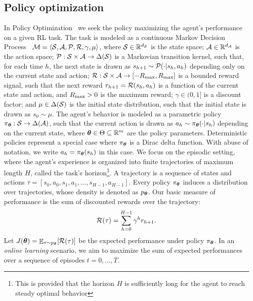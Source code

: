 \documentclass{article}
\begin{document}
\subsection{Policy optimization}
In Policy Optimization~\citep{deisenroth2013survey} we seek the policy maximizing the agent's performance on a given RL task. The task is modeled as a continuous Markov Decision Process~\citep[MDP,][]{puterman2014markov} $\mathcal{M} = \langle\mathcal{S},\mathcal{A},\mathcal{P},\mathcal{R},\gamma,\mu\rangle$, where $\mathcal{S}\in\mathbb{R}^{d_{\mathcal{S}}}$ is the state space; $\mathcal{A}\in\mathbb{R}^{d_{\mathcal{A}}}$ is the action space; $\mathcal{P}:\mathcal{S}\times\mathcal{A}\to\Delta(\mathcal{S})$ is a Markovian transition kernel, such that, for each time $h$, the next state is drawn as $s_{h+1}\sim\mathcal{P}(\cdot|s_h,a_h)$ depending only on the current state and action; $\mathcal{R}:\mathcal{S}\times\mathcal{A}\to[-R_{\max},R_{\max}]$ is a bounded reward signal, such that the next reward $r_{h+1} = \mathcal{R}(s_h,a_h)$ is a function of the current state and action, and $R_{\max}>0$ is the maximum reward; $\gamma\in(0,1]$ is a discount factor; and $\mu\in\Delta(\mathcal{S})$ is the initial state distribution, such that the initial state is drawn as $s_0\sim\mu$. The agent's behavior is modeled as a parametric policy $\pi_{\boldsymbol{\theta}}:\mathcal{S}\to\Delta(\mathcal{A})$, such that the current action is drawn as $a_h\sim\pi_{\boldsymbol{\theta}}(\cdot|s_h)$ depending on the current state, where $\boldsymbol{\theta}\in\Theta\subseteq\mathbb{R}^m$ are the policy parameters. Deterministic policies represent a special case where $\pi_{\boldsymbol{\theta}}$ is a Dirac delta function. With abuse of notation, we write $a_h=\pi_{\boldsymbol{\theta}}(s_h)$ in this case. We focus on the episodic setting, where the agent's experience is organized into finite trajectories of maximum length $H$, called the task's horizon\footnote{This is \wlg provided that the horizon $H$ is sufficiently long for the agent to reach steady optimal behavior}. A trajectory is a sequence of states and actions $\tau=[s_0,a_0,s_1,a_1,\dots,s_{H-1},a_{H-1}]$. Every policy $\pi_{\boldsymbol{\theta}}$ induces a distribution over trajectories, whose density is denoted as $p_{\boldsymbol{\theta}}$. Our basic measure of performance is the sum of discounted rewards over the trajectory:
\begin{align}\label{eq:Rtau}
	\mathcal{R}(\tau) = \sum_{h=0}^{H-1}\gamma^hr_{h+1}.
\end{align}
Let $J(\boldsymbol{\theta}) = \mathop{\mathbb{E}}_{\tau\sim p_{\boldsymbol{\theta}}}[\mathcal{R}(\tau)]$ be the expected performance under policy $\pi_{\boldsymbol{\theta}}$. In an \textit{online learning} scenario, we aim to maximize the sum of expected performances over a sequence of episodes $t=0,\dots,T$. 
\end{document}
